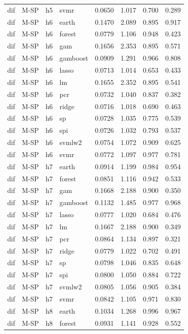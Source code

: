 \begin{ThreePartTable}
\begin{longtable}[t]{llclcccc}
dif & M-SP & h5 & svmr & 0.0650 & 1.017 & 0.700 & 0.289\\
\addlinespace
dif & M-SP & h6 & earth & 0.1470 & 2.089 & 0.895 & 0.917\\
dif & M-SP & h6 & forest & 0.0779 & 1.106 & 0.948 & 0.423\\
dif & M-SP & h6 & gam & 0.1656 & 2.353 & 0.895 & 0.571\\
dif & M-SP & h6 & gamboost & 0.0909 & 1.291 & 0.966 & 0.808\\
dif & M-SP & h6 & lasso & 0.0713 & 1.014 & 0.653 & 0.433\\
dif & M-SP & h6 & lm & 0.1655 & 2.352 & 0.895 & 0.541\\
dif & M-SP & h6 & pcr & 0.0732 & 1.040 & 0.837 & 0.382\\
dif & M-SP & h6 & ridge & 0.0716 & 1.018 & 0.690 & 0.463\\
dif & M-SP & h6 & sp & 0.0728 & 1.035 & 0.775 & 0.539\\
dif & M-SP & h6 & spi & 0.0726 & 1.032 & 0.793 & 0.537\\
dif & M-SP & h6 & svmlw2 & 0.0754 & 1.072 & 0.909 & 0.625\\
dif & M-SP & h6 & svmr & 0.0772 & 1.097 & 0.977 & 0.781\\
\addlinespace
dif & M-SP & h7 & earth & 0.0914 & 1.199 & 0.984 & 0.954\\
dif & M-SP & h7 & forest & 0.0851 & 1.116 & 0.942 & 0.533\\
dif & M-SP & h7 & gam & 0.1668 & 2.188 & 0.900 & 0.350\\
dif & M-SP & h7 & gamboost & 0.1132 & 1.485 & 0.977 & 0.968\\
dif & M-SP & h7 & lasso & 0.0777 & 1.020 & 0.684 & 0.476\\
dif & M-SP & h7 & lm & 0.1667 & 2.188 & 0.900 & 0.349\\
dif & M-SP & h7 & pcr & 0.0864 & 1.134 & 0.897 & 0.321\\
dif & M-SP & h7 & ridge & 0.0779 & 1.022 & 0.702 & 0.491\\
dif & M-SP & h7 & sp & 0.0798 & 1.046 & 0.835 & 0.648\\
dif & M-SP & h7 & spi & 0.0800 & 1.050 & 0.884 & 0.722\\
dif & M-SP & h7 & svmlw2 & 0.0805 & 1.056 & 0.905 & 0.384\\
dif & M-SP & h7 & svmr & 0.0842 & 1.105 & 0.971 & 0.830\\
\addlinespace
dif & M-SP & h8 & earth & 0.1034 & 1.268 & 0.996 & 0.967\\
dif & M-SP & h8 & forest & 0.0931 & 1.141 & 0.928 & 0.552\\

\end{longtable}
\end{ThreePartTable}
